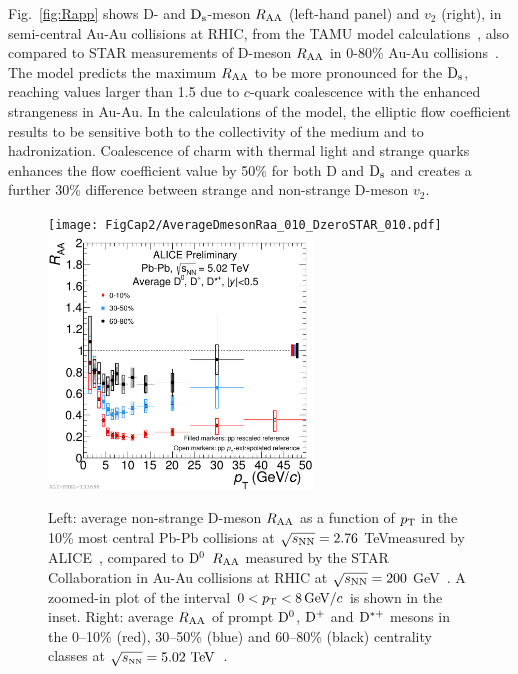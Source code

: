 Fig.~\ref{fig:Rapp} shows D- and ${\rm D_s}$-meson $R_{\rm AA}$ (left-hand panel)
and $v_2$ (right), in semi-central Au-Au collisions at 
RHIC, from the TAMU model calculations~\cite{He:2012df}, also
compared to STAR measurements of D-meson $R_{\rm AA}$ in 0-80\% Au-Au 
collisions~\cite{Zhang:2011uva}.
The model predicts the maximum $R_{\rm AA}$ to be more 
pronounced for the ${\rm D_s}$, reaching values larger than 1.5 due 
to $c$-quark coalescence with the enhanced strangeness in Au-Au.
In the calculations of the model, the elliptic flow coefficient results to be sensitive both 
to the collectivity of the medium and to hadronization. Coalescence of charm with 
thermal light and strange quarks enhances the flow coefficient 
value by 50\% for both D and ${\rm D_s}$ and creates a further 30\%
difference between strange and non-strange D-meson $v_2$.

\begin{figure}[!ht]
  \centering
    \texttt{[image: FigCap2/AverageDmesonRaa\_010\_DzeroSTAR\_010.pdf]}
    \includegraphics[width=7cm]{FigCap2/2017-Jul-05-DmesonAverage_010_3050_6080_comparison_04July2017.pdf}
  \caption{Left: average non-strange D-meson $R_{\rm AA}$ as a function of $p_{\rm T}$ in the 10\% most central Pb-Pb collisions at
 $\sqrt{s_{\rm NN}}=2.76$ TeVmeasured by ALICE~\cite{Adam:2015sza}, compared to ${\rm D^0}$ $R_{\rm AA}$ measured by the STAR Collaboration in Au-Au collisions at RHIC at
$\sqrt{s_{\rm NN}}=200$ GeV~\cite{Adamczyk:2014uip}. A zoomed-in plot of the interval $0 < p_{\rm T} < 8\, \mathrm{GeV}/c$ is shown in the inset. Right: average $R_{\rm AA}$ 
  of prompt ${\rm D^0}$, ${\rm D^+}$ and ${\rm D^{*+}}$ mesons in the 0--10\% (red), 30--50\% (blue) and 60--80\% (black) centrality classes at $\sqrt{s_{\rm \scriptscriptstyle NN}}=5.02~\mathrm{TeV}$~\cite{ALICE-PUBLIC-2017-003}.  }
  \label{fig:Raa}
\end{figure}

